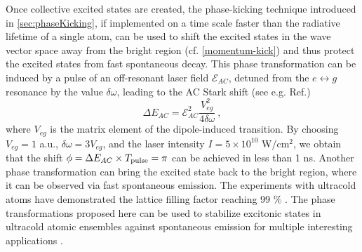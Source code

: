 Once collective excited states are created, the phase-kicking technique introduced in  \autoref{sec:phaseKicking}, 
if implemented on a time scale faster than the radiative lifetime of a single atom, 
can be used to shift the excited states in the wave vector space
away from the bright region (cf. \autoref{momentum-kick}) and thus protect the excited states from fast spontaneous decay. This phase transformation can be induced by a pulse of an off-resonant laser field $\mathcal{E}_{AC}$,
detuned from the  $e \leftrightarrow g$ resonance by the value  $\delta\omega$, leading to the
AC Stark shift {(see e.g. Ref.\cite{focusing-books-1})}
\begin{equation}
\Delta E_{AC} =  \mathcal{E}_{AC}^2 \frac{V_{eg}^2}{4 \delta \omega} \ ,
\end{equation}
where $V_{eg}$ is the matrix element of the dipole-induced transition.   By choosing $ V_{eg}= 1$ a.u.,
$\delta \omega = 3 V_{eg}$, and the laser intensity $I = 5\times10^{10}$ W/cm$^2$, we obtain that the shift
 $\phi = \Delta E_{AC} \times T_{\rm pulse} = \pi $ can be achieved in less than 1 ns. 
Another phase transformation can bring the excited state back to the bright region, where it can be observed via fast spontaneous emission. 
 The experiments with ultracold atoms have demonstrated  the lattice filling factor reaching 99 \%  \cite{atom-mott1, atom-mott2, atom-mott3}.
 The phase transformations proposed here can be used to stabilize excitonic states in ultracold atomic ensembles against spontaneous emission  
for multiple interesting applications \cite{Zoubi1, Zoubi-review}. 


